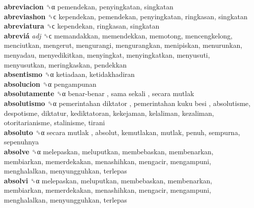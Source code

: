 \textbf{abreviacion} ␝α  pemendekan, penyingkatan, singkatan  \\
\textbf{abreviashon} ␝ϲ  kependekan, pemendekan, penyingkatan, ringkasan, singkatan  \\
\textbf{abreviatura} ␝ϲ  kependekan, ringkasan, singkatan  \\
\textbf{abreviá} \emph{adj}  ␝ϲ  memandakkan, memendekkan, memotong, mencengkelong, menciutkan, mengerut, mengurangi, mengurangkan, menipiskan, menurunkan, menyadau, menyedikitkan, menyingkat, menyingkatkan, menyusuti, menyusutkan, meringkaskan, pendekkan  \\
\textbf{absentismo} ␝α  ketiadaan, ketidakhadiran  \\
\textbf{absolucion} ␝α  pengampunan  \\
\textbf{absolutamente} ␝α   benar-benar ,  sama sekali ,  secara mutlak   \\
\textbf{absolutismo} ␝α   pemerintahan diktator ,  pemerintahan kuku besi , absolutisme, despotisme, diktatur, kediktatoran, kekejaman, kelaliman, kezaliman, otoritarianisme, stalinisme, tirani  \\
\textbf{absoluto} ␝α   secara mutlak , absolut, kemutlakan, mutlak, penuh, sempurna, sepenuhnya  \\
\textbf{absolve} ␝α  melepaskan, meluputkan, membebaskan, membenarkan, membiarkan, memerdekakan, menashihkan, mengacir, mengampuni, menghalalkan, menyungguhkan, terlepas  \\
\textbf{absolvi} ␝α  melepaskan, meluputkan, membebaskan, membenarkan, membiarkan, memerdekakan, menashihkan, mengacir, mengampuni, menghalalkan, menyungguhkan, terlepas  \\
